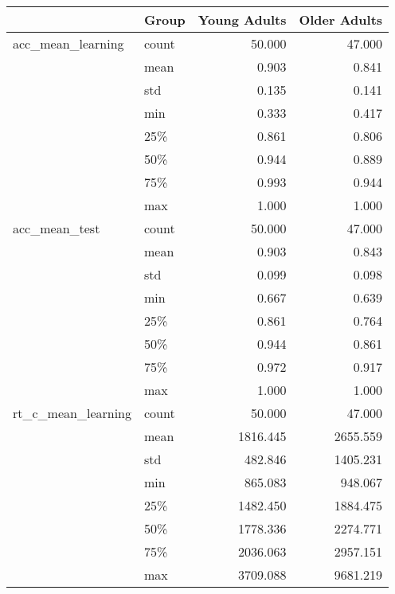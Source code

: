\begin{tabular}{llrr}
\toprule
                      & Group &  Young Adults &  Older Adults \\
\midrule
acc\_mean\_learning & count &        50.000 &        47.000 \\
                      & mean &         0.903 &         0.841 \\
                      & std &         0.135 &         0.141 \\
                      & min &         0.333 &         0.417 \\
                      & 25\% &         0.861 &         0.806 \\
                      & 50\% &         0.944 &         0.889 \\
                      & 75\% &         0.993 &         0.944 \\
                      & max &         1.000 &         1.000 \\
acc\_mean\_test & count &        50.000 &        47.000 \\
                      & mean &         0.903 &         0.843 \\
                      & std &         0.099 &         0.098 \\
                      & min &         0.667 &         0.639 \\
                      & 25\% &         0.861 &         0.764 \\
                      & 50\% &         0.944 &         0.861 \\
                      & 75\% &         0.972 &         0.917 \\
                      & max &         1.000 &         1.000 \\
rt\_c\_mean\_learning & count &        50.000 &        47.000 \\
                      & mean &      1816.445 &      2655.559 \\
                      & std &       482.846 &      1405.231 \\
                      & min &       865.083 &       948.067 \\
                      & 25\% &      1482.450 &      1884.475 \\
                      & 50\% &      1778.336 &      2274.771 \\
                      & 75\% &      2036.063 &      2957.151 \\
                      & max &      3709.088 &      9681.219 \\

\end{tabular}
